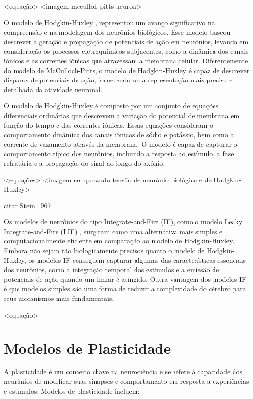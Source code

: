 <equação>
<imagem mcculloh-pitts neuron>

O modelo de Hodgkin-Huxley \cite{hodgkinQuantitative1952}, representou um avanço significativo na compreensão e na modelagem dos
neurônios biológicos. Esse modelo buscou descrever a geração e propagação de potenciais de ação em neurônios, levando em
consideração os processos eletroquímicos subjacentes, como a dinâmica dos canais iônicos e as correntes iônicas que atravessam a
membrana celular. Diferentemente do modelo de McCulloch-Pitts, o modelo de Hodgkin-Huxley é capaz de descrever disparos de
potenciais de ação, fornecendo uma representação mais precisa e detalhada da atividade neuronal.

O modelo de Hodgkin-Huxley é composto por um conjunto de equações diferenciais ordinárias que descrevem a variação do potencial de
membrana em função do tempo e das correntes iônicas. Essas equações consideram o comportamento dinâmico dos canais iônicos de
sódio e potássio, bem como a corrente de vazamento através da membrana. O modelo é capaz de capturar o comportamento típico dos
neurônios, incluindo a resposta ao estímulo, a fase refratária e a propagação do sinal ao longo do axônio.

<equações>
<imagem comparando tensão de neurônio biológico e de Hodgkin-Huxley>

citar Stein 1967

Os modelos de neurônios do tipo Integrate-and-Fire (IF), como o modelo Leaky Integrate-and-Fire (LIF) \cite{burkitt2006review},
surgiram como uma alternativa mais simples e computacionalmente eficiente em comparação ao modelo de Hodgkin-Huxley. Embora não
sejam tão biologicamente precisos quanto o modelo de Hodgkin-Huxley, os modelos IF conseguem capturar algumas das características
essenciais dos neurônios, como a integração temporal dos estímulos e a emissão de potenciais de ação quando um limiar é atingido.
Outra vantagem dos modelos IF é que modelos simples são uma forma de reduzir a complexidade do cérebro para seus mecanismos mais
fundamentais.

<equação>

\section{Modelos de Plasticidade}

A plasticidade é um conceito chave na neurociência e se refere à capacidade dos neurônios de modificar suas sinapses e
comportamento em resposta a experiências e estímulos. Modelos de plasticidade incluem:

